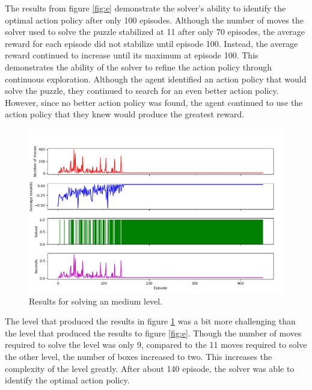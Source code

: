 \documentclass[times, 10pt,twocolumn]{article}
\begin{document}
The results from figure \ref{fig:e} demonstrate the solver's ability to identify the optimal action policy after only 100 episodes. Although the number of moves the solver used to solve the puzzle stabilized at 11 after only 70 episodes, the average reward for each episode did not stabilize until episode 100. Instead, the average reward continued to increase until its maximum at episode 100. This demonstrates the ability of the solver to refine the action policy through continuous exploration. Although the agent identified an action policy that would solve the puzzle, they continued to search for an even better action policy. However, since no better action policy was found, the agent continued to use the action policy that they knew would produce the greatest reward.

\begin{figure}[h] 
  \centering
     \includegraphics[width=\linewidth]{images/medium_graph.png}
  \caption{Results for solving an medium level.}
  \label{fig:m}
\end{figure}

The level that produced the results in figure \ref{fig:m} was a bit more challenging than the level that produced the results to figure \ref{fig:e}. Though the number of moves required to solve the level was only 9, compared to the 11 moves required to solve the other level, the number of boxes increased to two. This increases the complexity of the level greatly. After about 140 episode, the solver was able to identify the optimal action policy.  
\end{document}
